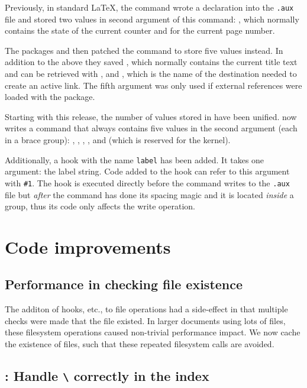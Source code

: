 \documentclass{ltnews}
\begin{document}
Previously, in standard \LaTeX{}, the  command wrote a  declaration into
the \texttt{.aux} file and stored two values in
second argument of this  command:
, which normally contains the state of the current 
counter and  for the current page number.

The packages  and 
 then patched the  command to store five values instead.
In addition to the above they saved , which normally contains the 
current title text and can be retrieved with , and 
, which is the name of the destination needed to create an 
active link. The fifth argument was only used if external 
references were loaded with the  package. 

Starting with this release, the number of values stored in  have been unified. 
 now writes a
 command that always contains five values in the second argument (each in a brace group):
, , , 
, and  (which is reserved for the kernel).

Additionally, a hook with the name \texttt{label} has been 
added. It takes one argument: the label string.
Code added to the hook can refer to this argument with \verb+#1+. 
The hook is executed directly before the  command writes to the \texttt{.aux} file
but \emph{after} the  command has done its spacing magic and it is located \emph{inside} a group, thus its code only affects the write operation. 

\section{Code improvements}

\subsection{Performance in checking file existence}

The additon of hooks, etc., to file operations had a side-effect in that
multiple checks were made that the file existed. In larger documents using
lots of files, these filesystem operations caused non-trivial performance
impact. We now cache the existence of files, such that these repeated filesystem
calls are avoided.

\subsection{: Handle \texttt{\textbackslash\textvisiblespace} correctly in the index}
\end{document}

